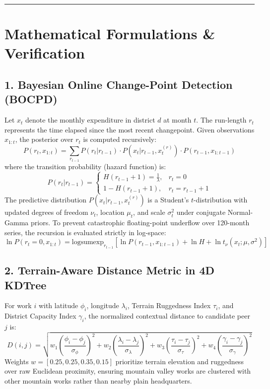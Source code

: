 \documentclass[11pt,a4paper]{article}
\begin{document}
\vspace{1em}\hrule\vspace{1em}

\section{Mathematical Formulations \& Verification}

\subsection{1. Bayesian Online Change-Point Detection (BOCPD)}
Let $x_t$ denote the monthly expenditure in district $d$ at month $t$. The run-length $r_t$ represents the time elapsed since the most recent changepoint. Given observations $x_{1:t}$, the posterior over $r_t$ is computed recursively:
\[ P(r_t, x_{1:t}) = \sum_{r_{t-1}} P(r_t | r_{t-1}) \cdot P(x_t | r_{t-1}, x_{t}^{(r)}) \cdot P(r_{t-1}, x_{1:t-1}) \]
where the transition probability (hazard function) is:
\[ P(r_t | r_{t-1}) = \begin{cases} H(r_{t-1} + 1) = \frac{1}{\lambda}, & r_t = 0 \\ 1 - H(r_{t-1} + 1), & r_t = r_{t-1} + 1 \end{cases} \]
The predictive distribution $P(x_t | r_{t-1}, x_{t}^{(r)})$ is a Student's $t$-distribution with updated degrees of freedom $\nu_t$, location $\mu_t$, and scale $\sigma_t^2$ under conjugate Normal-Gamma priors. To prevent catastrophic floating-point underflow over 120-month series, the recursion is evaluated strictly in log-space:
\[ \ln P(r_t=0, x_{1:t}) = \text{logsumexp}_{r_{t-1}} \left[ \ln P(r_{t-1}, x_{1:t-1}) + \ln H + \ln t_{\nu}(x_t; \mu, \sigma^2) \right] \]

\subsection{2. Terrain-Aware Distance Metric in 4D KDTree}
For work $i$ with latitude $\phi_i$, longitude $\lambda_i$, Terrain Ruggedness Index $\tau_i$, and District Capacity Index $\gamma_i$, the normalized contextual distance to candidate peer $j$ is:
\[ D(i, j) = \sqrt{ w_1 \left( \frac{\phi_i - \phi_j}{\sigma_\phi} \right)^2 + w_2 \left( \frac{\lambda_i - \lambda_j}{\sigma_\lambda} \right)^2 + w_3 \left( \frac{\tau_i - \tau_j}{\sigma_\tau} \right)^2 + w_4 \left( \frac{\gamma_i - \gamma_j}{\sigma_\gamma} \right)^2 } \]
Weights $w = [0.25, 0.25, 0.35, 0.15]$ prioritize terrain elevation and ruggedness over raw Euclidean proximity, ensuring mountain valley works are clustered with other mountain works rather than nearby plain headquarters.
\end{document}
